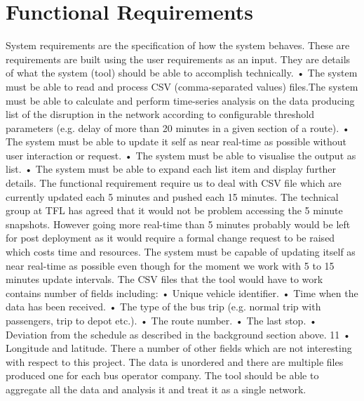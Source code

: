 	\section{Functional Requirements}
	System requirements are the specification of how the system behaves. These
are requirements are built using the user requirements as an input. They are
details of what the system (tool) should be able to accomplish technically.
• The system must be able to read and process CSV (comma-separated
values) files.The system must be able to calculate and perform time-series analysis
on the data producing list of the disruption in the network according to
configurable threshold parameters (e.g. delay of more than 20 minutes
in a given section of a route).
• The system must be able to update it self as near real-time as possible
without user interaction or request.
• The system must be able to visualise the output as list.
• The system must be able to expand each list item and display further
details.
The functional requirement require us to deal with CSV file which are currently
updated each 5 minutes and pushed each 15 minutes. The technical
group at TFL has agreed that it would not be problem accessing the 5 minute
snapshots. However going more real-time than 5 minutes probably would be
left for post deployment as it would require a formal change request to be raised
which costs time and resources. The system must be capable of updating itself
as near real-time as possible even though for the moment we work with 5 to
15 minutes update intervals.
The CSV files that the tool would have to work contains number of fields
including:
• Unique vehicle identifier.
• Time when the data has been received.
• The type of the bus trip (e.g. normal trip with passengers, trip to depot
etc.).
• The route number.
• The last stop.
• Deviation from the schedule as described in the background section above.
11
• Longitude and latitude.
There a number of other fields which are not interesting with respect to this
project. The data is unordered and there are multiple files produced one for
each bus operator company. The tool should be able to aggregate all the data
and analysis it and treat it as a single network.